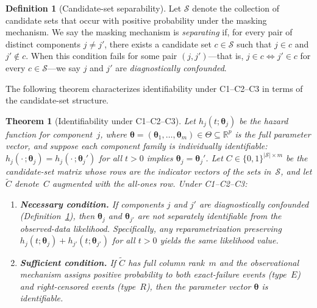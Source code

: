 \documentclass[11pt]{article}
\theoremstyle{definition}
\newtheorem{definition}{Definition}
\theoremstyle{plain}
\newtheorem{theorem}{Theorem}
\renewcommand{\v}[1]{\boldsymbol{#1}}
\begin{document}
\begin{definition}[Candidate-set separability]
\label{def:separability}
Let $\mathcal{S}$ denote the collection of candidate sets that occur
with positive probability under the masking mechanism.
We say the masking mechanism is \emph{separating} if, for every pair
of distinct components $j \neq j'$, there exists a candidate set
$c \in \mathcal{S}$ such that $j \in c$ and $j' \notin c$.
When this condition fails for some pair $(j, j')$---that is,
$j \in c \iff j' \in c$ for every $c \in \mathcal{S}$---we say $j$
and $j'$ are \emph{diagnostically confounded}.
\end{definition}

The following theorem characterizes identifiability under C1--C2--C3
in terms of the candidate-set structure.

\begin{theorem}[Identifiability under C1--C2--C3]
\label{thm:identifiability}
Let $h_j(t; \v{\theta}_j)$ be the hazard function for component~$j$,
where $\v{\theta} = (\v{\theta}_1, \ldots, \v{\theta}_m) \in \Theta
\subseteq \mathbb{R}^p$ is the full parameter vector, and suppose
each component family is individually identifiable: $h_j(\cdot\,;
\v{\theta}_j) = h_j(\cdot\,; \v{\theta}_j')$ for all $t > 0$ implies
$\v{\theta}_j = \v{\theta}_j'$.
Let $C \in \{0,1\}^{|\mathcal{S}| \times m}$ be the candidate-set
matrix whose rows are the indicator vectors of the sets
in~$\mathcal{S}$, and let $\tilde{C}$ denote~$C$ augmented with the
all-ones row.
Under C1--C2--C3:
\begin{enumerate}
    \item[\emph{(a)}] \textbf{Necessary condition.}
    If components $j$ and $j'$ are diagnostically confounded
    (Definition~\ref{def:separability}), then $\v{\theta}_j$ and
    $\v{\theta}_{j'}$ are not separately identifiable from the
    observed-data likelihood.
    Specifically, any reparametrization preserving
    $h_j(t; \v{\theta}_j) + h_{j'}(t; \v{\theta}_{j'})$ for all
    $t > 0$ yields the same likelihood value.

    \item[\emph{(b)}] \textbf{Sufficient condition.}
    If $\tilde{C}$ has full column rank~$m$ and the observational
    mechanism assigns positive probability to both exact-failure
    events (type~$E$) and right-censored events (type~$R$),
    then the parameter vector $\v{\theta}$ is identifiable.
\end{enumerate}
\end{theorem}
\end{document}
